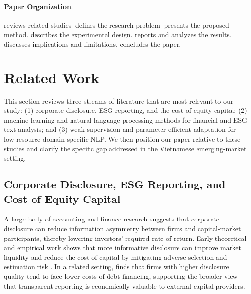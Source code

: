 \documentclass{article}
\theoremstyle{plain}
\theoremstyle{definition}
\theoremstyle{remark}
\begin{document}
\paragraph{Paper Organization.}
 reviews related studies.  defines the research problem.  presents the proposed method.  describes the experimental design.  reports and analyzes the results.  discusses implications and limitations.  concludes the paper.

\section{Related Work}
\label{sec:related_work}

This section reviews three streams of literature that are most relevant to our study: 
(1) corporate disclosure, ESG reporting, and the cost of equity capital; 
(2) machine learning and natural language processing methods for financial and ESG text analysis; and 
(3) weak supervision and parameter-efficient adaptation for low-resource domain-specific NLP. 
We then position our paper relative to these studies and clarify the specific gap addressed in the Vietnamese emerging-market setting.

\subsection{Corporate Disclosure, ESG Reporting, and Cost of Equity Capital}

A large body of accounting and finance research suggests that corporate disclosure can reduce information asymmetry between firms and capital-market participants, thereby lowering investors' required rate of return. Early theoretical and empirical work shows that more informative disclosure can improve market liquidity and reduce the cost of capital by mitigating adverse selection and estimation risk \citep{diamond1991disclosure,easley2004information,botosan1997disclosure}. 
In a related setting, \citet{sengupta1998disclosure} finds that firms with higher disclosure quality tend to face lower costs of debt financing, supporting the broader view that transparent reporting is economically valuable to external capital providers.
\end{document}
